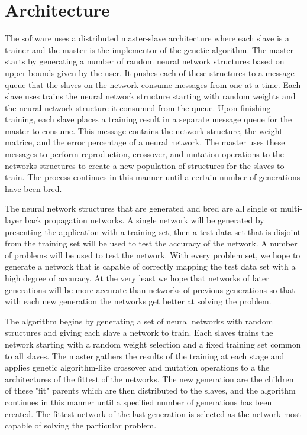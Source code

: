 \section{Architecture}
The software uses a distributed master-slave architecture where each slave is a trainer and the master is the implementor of the genetic algorithm. The master starts by generating a number of random neural network structures based on upper bounds given by the user. It pushes each of these structures to a message queue that the slaves on the network consume messages from one at a time. Each slave uses trains the neural network structure starting with random weights and the neural network structure it consumed from the queue. Upon finishing training, each slave places a training result in a separate message queue for the master to consume. This message contains the network structure, the weight matrice, and the error percentage of a neural network. The master uses these messages to perform reproduction, crossover, and mutation operations to the networks structures to create a new population of structures for the slaves to train. The process continues in this manner until a certain number of generations have been bred. 

The neural network structures that are generated and bred are all single or multi-layer back propagation networks.  A single network will be generated by presenting the application with a training set, then a test data set that is disjoint from the training set will be used to test the accuracy of the network.  A number of problems will be used to test the network.  With every problem set, we hope to generate a network that is capable of correctly mapping the test data set with a high degree of accuracy.  At the very least we hope that networks of later generations will be more accurate than networks of previous generations so that with each new generation the networks get better at solving the problem.

The algorithm begins by generating a set of neural networks with random structures and giving each slave a network to train.  Each slaves trains the network starting with a random weight selection and a fixed training set common to all slaves. The master gathers the results of the training at each stage and applies genetic algorithm-like crossover and mutation operations to a the architectures of the fittest of the networks.  The new generation are the children of these "fit" parents which are then distributed to the slaves, and the algorithm continues in this manner until a specified number of generations has been created.  The fittest network of the last generation is selected as the network most capable of solving the particular problem.  
